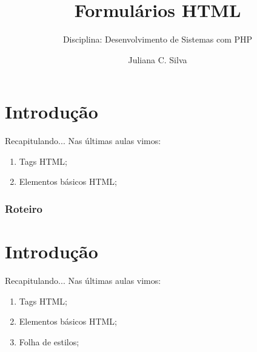 \documentclass{beamer}
\title[HTML + CSS]{Formulários HTML}
\subtitle{Disciplina: Desenvolvimento de Sistemas com PHP}
\author{Juliana C. Silva}
\institute{Universidade Positivo}
\begin{document}
\frame{\titlepage}
 

\section{Introdução}
\begin{frame}{Recapitulando...}
Nas últimas aulas vimos:
  \begin{enumerate}
   \item Tags HTML;
   \item Elementos básicos HTML;
  \end{enumerate}
\end{frame}
\begin{frame}
\frametitle{Roteiro} %
\tableofcontents %
\end{frame}
\section{Introdução}
\begin{frame}{Recapitulando...}
Nas últimas aulas vimos:
  \begin{enumerate}
   \item Tags HTML;
   \item Elementos básicos HTML;
   \item Folha de estilos;
  \end{enumerate}
\end{frame}
\end{document}
